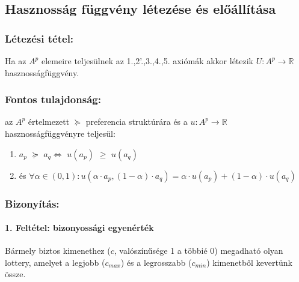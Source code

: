 \documentclass[a4paper,12pt]{article}
\begin{document}

\subsection{Hasznosság függvény létezése és előállítása}

\subsubsection{Létezési tétel: } Ha az $A^p$ elemeire teljesülnek az 1.,2'.,3.,4.,5. axiómák akkor létezik  $U: A^p \rightarrow \mathbb{R}$ hasznosságfüggvény.

\subsubsection{Fontos tulajdonság: } az $A^p$ értelmezett $\succeq$ preferencia struktúrára és a $u: A^p \rightarrow \mathbb{R}$ hasznosságfüggvényre teljesül: 
\begin{enumerate}
\item $a_p$  $\succeq$ $a_q \Leftrightarrow $ $u(a_p)$  $\geq$ $u(a_q)$
\item és $\forall  \alpha \in (0,1): u(\alpha\cdot a_p , (1-\alpha)\cdot a_q ) = \alpha\cdot u(a_p) + (1-\alpha)\cdot u(a_q) $
\end{enumerate}

\subsubsection{Bizonyítás: }
 
\paragraph{1. Feltétel: bizonyossági egyenérték}
Bármely biztos kimenethez ($c$, valószínűsége 1 a többié 0) megadható olyan lottery, amelyet a legjobb ($c_{max}$) és a legrosszabb ($c_{min}$) kimenetből kevertünk össze. 
\end{document}
